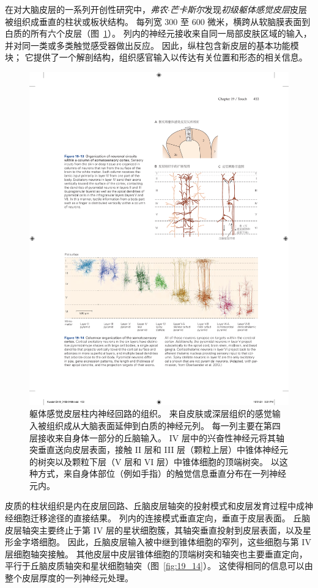 在对大脑皮层的一系列开创性研究中，\textit{弗农$\cdot$芒卡斯尔}发现\textit{初级躯体感觉皮层}皮层被组织成垂直的柱状或板状结构。
每列宽 300 至 600 微米，横跨从软脑膜表面到白质的所有六个皮层（图~\ref{fig:19_13}）。
列内的神经元接收来自同一局部皮肤区域的输入，并对同一类或多类触觉感受器做出反应。
因此，纵柱包含新皮层的基本功能模块；
它提供了一个解剖结构，组织感官输入以传达有关位置和形态的相关信息。


\begin{figure}[htbp]
	\centering
	\includegraphics[width=0.75\linewidth]{chap19/fig_19_13}
	\caption{躯体感觉皮层柱内神经回路的组织。
		来自皮肤或深层组织的感觉输入被组织成从大脑表面延伸到白质的神经元列。
		每一列主要在第四层接收来自身体一部分的丘脑输入。
		IV 层中的兴奋性神经元将其轴突垂直送向皮层表面，接触 II 层和 III 层（颗粒上层）中锥体神经元的树突以及颗粒下层（V 层和 VI 层）中锥体细胞的顶端树突。
		以这种方式，来自身体部位（例如手指）的触觉信息垂直分布在一列神经元内。}
	\label{fig:19_13}
\end{figure}


皮质的柱状组织是内在皮层回路、丘脑皮层轴突的投射模式和皮层发育过程中成神经细胞迁移途径的直接结果。
列内的连接模式垂直定向，垂直于皮层表面。
丘脑皮层轴突主要终止于第 IV 层的星状细胞簇，其轴突垂直投射到皮层表面，以及星形金字塔细胞。
因此，丘脑皮层输入被中继到锥体细胞的窄列，这些细胞与第 IV 层细胞轴突接触。
其他皮层中皮层锥体细胞的顶端树突和轴突也主要垂直定向，平行于丘脑皮质轴突和星状细胞轴突（图~\ref{fig:19_14}）。
这使得相同的信息可以由整个皮层厚度的一列神经元处理。


